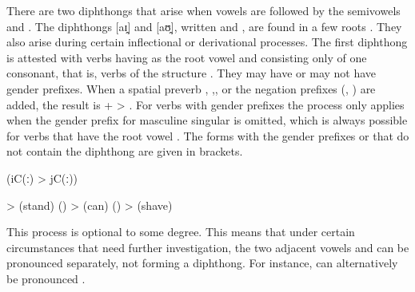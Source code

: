 There are two diphthongs that arise when vowels are followed by the semivowels  and . The diphthongs [aɪ̯] and [aʊ̯], written  and , are found in a few roots . They also arise during certain inflectional or derivational processes. The first diphthong is attested with verbs having  as the root vowel and consisting only of one consonant, that is, verbs of the structure . They may have or may not have gender prefixes. When a spatial preverb , ,, or the negation prefixes (, ) are added, the result is  +  > . For verbs with gender prefixes the process only applies when the gender prefix  for masculine singular is omitted, which is always possible for verbs that have the root vowel . The forms with the gender prefixes  or  that do not contain the diphthong are given in brackets.
%
\begin{exe}
	 (iC(ː) > jC(ː))\label{ex:a i aj phon}
	\begin{xlist}
		\ex	{} >   (stand) ()
		\ex	{} >   (can) ()
		\ex	{} >   (shave)
	\end{xlist}
\end{exe}

This process is optional to some degree. This means that under certain circumstances that need further investigation, the two adjacent vowels  and  can be pronounced separately, not forming a diphthong. For instance,  can alternatively be pronounced  .

